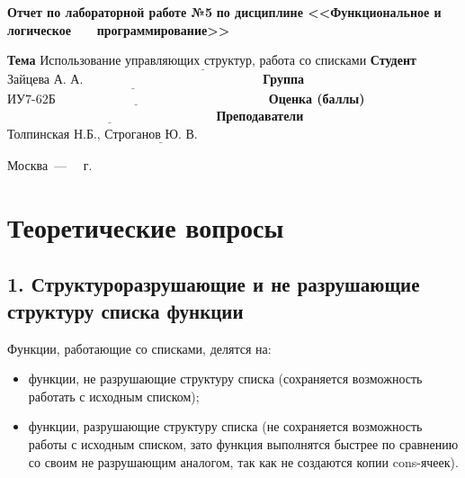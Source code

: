 \documentclass[12pt]{report}
\begin{document}
\begin{titlepage}
		\begin{center}
			\noindent\begin{minipage}{1.1\textwidth}\centering
				\Large\textbf{  Отчет по лабораторной работе №5}\newline
				\textbf{по дисциплине <<Функциональное и логическое}\newline
				\textbf{~~~программирование>>}\newline\newline
			\end{minipage}
		\end{center}
		
		\noindent\textbf{Тема} $\underline{\text{Использование управляющих структур, работа со списками}}$\newline\newline
		\noindent\textbf{Студент} $\underline{\text{Зайцева А. А.~~~~~~~~~~~~~~~~~~~~~~~~~~~~~~~~~~~~~~~~~~}}$\newline\newline
		\noindent\textbf{Группа} $\underline{\text{ИУ7-62Б~~~~~~~~~~~~~~~~~~~~~~~~~~~~~~~~~~~~~~~~~~~~~~~~~~}}$\newline\newline
		\noindent\textbf{Оценка (баллы)} $\underline{\text{~~~~~~~~~~~~~~~~~~~~~~~~~~~~~~~~~~~~~~~~~~~~~~~~~}}$\newline\newline
		\noindent\textbf{Преподаватели} $\underline{\text{Толпинская Н.Б., Строганов Ю. В.~~~~~~~~~~~~~~~~~~~~~~~~~~~~}}$\newline\newline\newline
		
		\begin{center}
			\vfill
			Москва~---~\the\year
			~г.
		\end{center}
	\end{titlepage}
	
\chapter*{Теоретические вопросы}

\section*{1. Структуроразрушающие и не разрушающие структуру списка функции}

Функции, работающие со списками, делятся на:
\begin{itemize}
	\item функции, не разрушающие структуру списка (сохраняется возможность работать с исходным списком);
	\item функции, разрушающие структуру списка (не сохраняется возможность работы с исходным списком, зато функция выполнятся быстрее по сравнению со своим не разрушающим аналогом, так как не создаются копии cons-ячеек).
\end{itemize}
\end{document}
